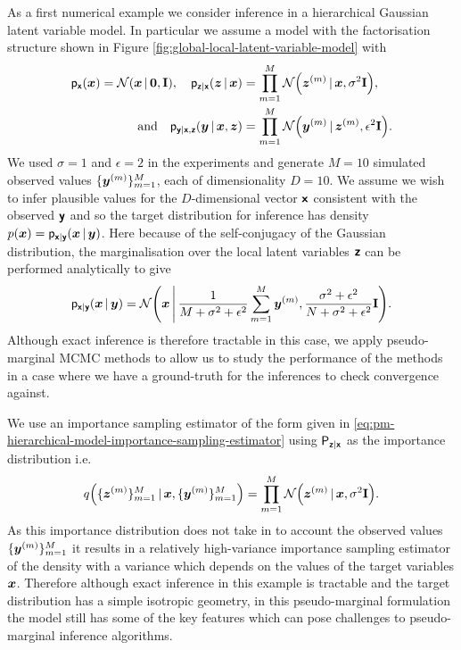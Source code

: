 As a first numerical example we consider inference in a hierarchical Gaussian latent variable model. In particular we assume a model with the factorisation structure shown in Figure \ref{fig:global-local-latent-variable-model} with
\begin{equation}
\begin{split}
\pden{\rvct{x}}(\vct{x}) = \nrm{\vct{x}\gvn\vct{0},\mathbf{I}},
\quad
\pden{\rvct{z}|\rvct{x}}(\vct{z}\gvn\vct{x}) &= \prod_{m=1}^M \nrm{\vct{z}^{(m)}\gvn\vct{x},\sigma^2\mathbf{I}},\\
\quad\textrm{and}\quad
\pden{\rvct{y}|\rvct{x},\rvct{z}}(\vct{y}\gvn\vct{x},\vct{z}) &= \prod_{m=1}^M \nrm{\vct{y}^{(m)}\gvn\vct{z}^{(m)},\epsilon^2\mathbf{I}}.
\end{split}
\end{equation}
We used $\sigma=1$ and $\epsilon=2$ in the experiments and generate $M=10$ simulated observed values $\lbrace \boldsymbol{y}^{(m)}\rbrace_{m=1}^M$, each of dimensionality $D=10$. We assume we wish to infer plausible values for the $D$-dimensional vector $\boldsymbol{\mathsf{x}}$ consistent with the observed $\boldsymbol{\mathsf{y}}$ and so the target distribution for inference has density $p(\boldsymbol{x}) = \mathsf{p}_{\boldsymbol{\mathsf{x}}|\boldsymbol{\mathsf{y}}}(\boldsymbol{x}\operatorname{|}\boldsymbol{y})$. Here because of the self-conjugacy of the Gaussian distribution, the marginalisation over the local latent variables $\boldsymbol{\mathsf{z}}$ can be performed analytically to give
\begin{equation}\label{eq:gaussian-latent-model-analytic-posterior}
  \pden{\rvct{x}|\rvct{y}}(\vct{x}\gvn\vct{y}) =
  \nrm{\vct{x} \,\middle|\, \frac{1}{M + \sigma^2 + \epsilon^2} \sum_{m=1}^M \vct{y}^{(m)}, \frac{\sigma^2+\epsilon^2}{N + \sigma^2 + \epsilon^2} \mathbf{I}}.
\end{equation}
Although exact inference is therefore tractable in this case, we apply pseudo-marginal \ac{MCMC} methods to allow us to study the performance of the methods in a case where we have a ground-truth for the inferences to check convergence against.

We use an importance sampling estimator of the form given in \eqref{eq:pm-hierarchical-model-importance-sampling-estimator} using $\mathsf{P}_{\boldsymbol{\mathsf{z}}|\boldsymbol{\mathsf{x}}}$ as the importance distribution  i.e.
\begin{equation}
  q\lpa\lbrace \vct{z}^{(m)} \rbrace_{m=1}^M \gvn \vct{x}, \lbrace \vct{y}^{(m)} \rbrace_{m=1}^M\rpa 
  = \prod_{m=1}^M \nrm{\vct{z}^{(m)} \gvn \vct{x}, \sigma^2 \mathbf{I}}.
\end{equation}
As this importance distribution does not take in to account the observed values $\lbrace \boldsymbol{y}^{(m)}\rbrace_{m=1}^M$ it results in a relatively high-variance importance sampling estimator of the density with a variance which depends on the values of the target variables $\boldsymbol{x}$. Therefore although exact inference in this example is tractable and the target distribution has a simple isotropic geometry, in this pseudo-marginal formulation the model still has some of the key features which can pose challenges to pseudo-marginal inference algorithms.

